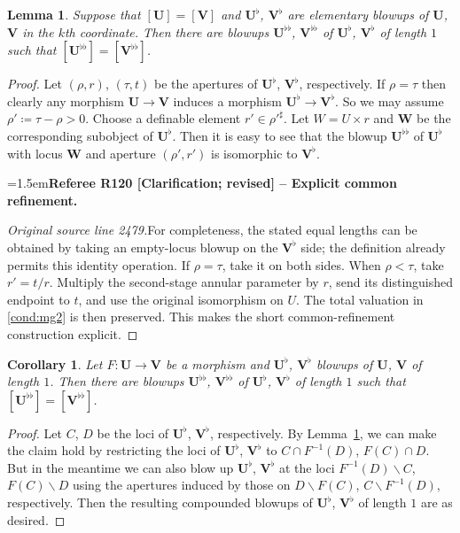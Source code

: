 \documentclass[12pt]{amsart}
\newcommand{\RefereeRemark}[4]{%
  \par\medskip\begingroup\normalfont\small\color{RefereePurple}%
  \emergencystretch=1.5em\noindent\textbf{Referee R#1 [#2] -- #3.}\par\nobreak\noindent #4\par
  \endgroup\medskip
}
\theoremstyle{plain}
\newtheorem{cor}[thm]{Corollary}
\newtheorem{lem}[thm]{Lemma}
\theoremstyle{definition}
\theoremstyle{remark}
\numberwithin{equation}{section}
\theoremstyle{plain}
\newcommand{\0}{\emptyset}
\newcommand{\fun}{\longrightarrow}
\newcommand{\mi}{\smallsetminus}
\begin{document}
\begin{lem}\label{elementary:blowups:preserves:iso:vol}
Suppose that $[\bm U] = [\bm V]$ and $\bm U^{\flat}$, $\bm V^{\flat}$ are elementary blowups of $\bm U$, $\bm V$ in the $k$th coordinate. Then there are  blowups $\bm U^{\flat\flat}$, $\bm V^{\flat\flat}$ of $\bm U^{\flat}$, $\bm V^{\flat}$ of length $1$ such that $[\bm U^{\flat\flat}] = [\bm V^{\flat\flat}]$.
\end{lem}
\begin{proof}
Let $(\rho, r)$, $(\tau, t)$ be the apertures of  $\bm U^{\flat}$, $\bm V^{\flat}$, respectively. If $\rho = \tau$ then clearly any morphism $\bm U \fun \bm V$ induces a morphism $\bm U^{\flat} \fun \bm V^{\flat}$. So we may assume $\rho' \coloneqq \tau - \rho > 0$. Choose a definable element $r' \in \rho'^\sharp$. Let $W = U \times r$ and $\bm W$ be the corresponding subobject of $\bm U^{\flat}$. Then it is easy to see that the blowup $\bm U^{\flat\flat}$  of $\bm U^{\flat}$ with locus $\bm W$ and aperture $(\rho', r')$ is isomorphic to $\bm V^{\flat}$.

\RefereeRemark{120}{Clarification; revised}{Explicit common refinement}{%
\textit{Original source line 2479.}\quad For completeness, the stated equal lengths can be obtained by taking an empty-locus blowup on the $\bm V^\flat$ side; the definition already permits this identity operation. If $\rho=\tau$, take it on both sides. When $\rho<\tau$, take $r'=t/r$. Multiply the second-stage annular parameter by $r$, send its distinguished endpoint to $t$, and use the original isomorphism on $U$. The total valuation in \eqref{cond:mg2} is then preserved. This makes the short common-refinement construction explicit.
}
\end{proof}

\begin{cor}\label{eblowup:same:loci:iso}
Let $F : \bm U \fun \bm V$ be a morphism and $\bm U^{\flat}$, $\bm V^{\flat}$ blowups of  $\bm U$, $\bm V$ of length $1$. Then there are blowups $\bm U^{\flat\flat}$, $\bm V^{\flat\flat}$ of $\bm U^{\flat}$, $\bm V^{\flat}$ of length $1$ such that $[\bm U^{\flat\flat}] = [\bm V^{\flat\flat}]$.
\end{cor}
\begin{proof}
Let  $C$, $D$ be the loci of $\bm U^{\flat}$, $\bm V^{\flat}$, respectively. By Lemma~\ref{elementary:blowups:preserves:iso:vol}, we can make the claim hold by restricting the loci of $\bm U^{\flat}$, $\bm V^{\flat}$ to $C \cap F^{-1}(D)$, $F(C) \cap D$. But in the meantime we can also blow up $\bm U^{\flat}$, $\bm V^{\flat}$ at the loci $F^{-1}(D) \mi C$, $F(C) \mi D$ using the apertures induced by those on $D \mi F(C)$, $C \mi F^{-1}(D)$, respectively. Then the resulting compounded blowups of $\bm U^{\flat}$, $\bm V^{\flat}$ of length $1$ are as desired.
\end{proof}
\end{document}
